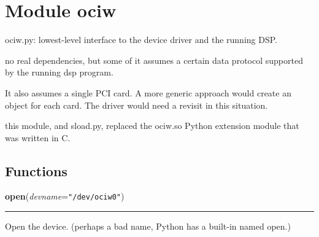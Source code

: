 %
%
%


\section{Module ociw}

    \label{ociw}
ociw.py: lowest-level interface to the device driver and the running DSP.

no real dependencies, but some of it assumes a certain data protocol 
supported by the running dsp program.

It also assumes a single PCI card. A more generic approach would create an 
object for each card. The driver would need a revisit in this situation.

this module, and sload.py, replaced the ociw.so Python extension module 
that was written in C.



  \subsection{Functions}

    \label{ociw:open}

    \vspace{0.5ex}

    \begin{boxedminipage}{\textwidth}

    \raggedright \textbf{open}(\textit{devname}=\texttt{"/dev/ociw0"})

    \vspace{-1.5ex}

    \rule{\textwidth}{0.5\fboxrule}
    Open the device. (perhaps a bad name, Python has a built-in named 
    open.)

    \vspace{1ex}

    \end{boxedminipage}

